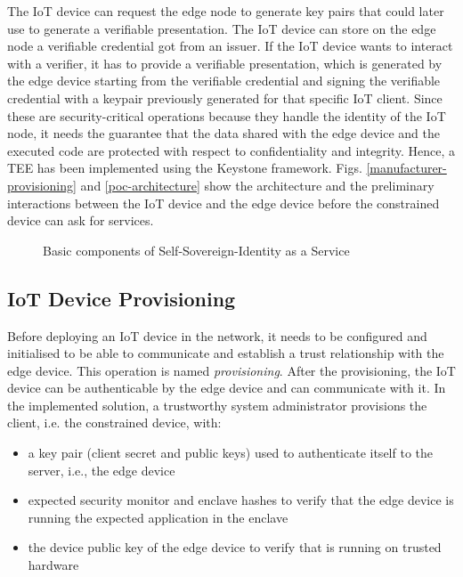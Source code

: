 The IoT device can request the edge node to generate key pairs that could later use to generate a verifiable presentation. The IoT device can store on the edge node a verifiable credential got from an issuer. If the IoT device wants to interact with a verifier, it has to provide a verifiable presentation, which is generated by the edge device starting from the verifiable credential and signing the verifiable credential with a keypair previously generated for that specific IoT client. 
Since these are security-critical operations because they handle the identity of the IoT node, it needs the guarantee that the data shared with the edge device and the executed code are protected with respect to confidentiality and integrity. Hence, a TEE has been implemented using the Keystone framework. Figs. \ref{manufacturer-provisioning} and \ref{poc-architecture} show the architecture and the preliminary interactions between the IoT device and the edge device before the constrained device can ask for services. 

\begin{figure}[H]
    \centering
    
    \caption{Basic components of Self-Sovereign-Identity as a Service}
    \label{poc-design}
\end{figure}

\subsection{IoT Device Provisioning}
Before deploying an IoT device in the network, it needs to be configured and initialised to be able to communicate and establish a trust relationship with the edge device. This operation is named \textit{provisioning}. 
After the provisioning, the IoT device can be authenticable by the edge device and can communicate with it. 
In the implemented solution, a trustworthy system administrator provisions the client, i.e. the constrained device, with: 
\begin{itemize}
    \item a key pair (client secret and public keys) used to authenticate itself to the server, i.e., the edge device
    \item expected security monitor and enclave hashes to verify that the edge device is running the expected application in the enclave 
    \item the device public key of the edge device to verify that is running on trusted hardware
\end{itemize} 


